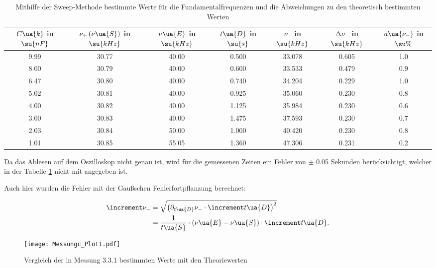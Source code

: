 \begin{table}
  \centering
  \begin{tabular}{ c | c | c | c | c | c | c }
    \toprule $C\ua{k}$ in $\su{nF}$
           & $\nu_{+} \, (\nu\ua{S})$ in $\su{kHz}$ & $\nu\ua{E}$ in $\su{kHz}$
           & $t\ua{D}$ in $\su{s}$ & $\nu_{-}$ in $\su{kHz}$
           & $\increment \nu_{-}$ in $\su{kHz}$ & $a\ua{\nu_{-}}$ in $\su{\%}$ \\
    \midrule
    9.99 & 30.77 & 40.00 & 0.500 & 33.078 & 0.605 & 1.0 \\
    8.00 & 30.79 & 40.00 & 0.600 & 33.533 & 0.479 & 0.9 \\
    6.47 & 30.80 & 40.00 & 0.740 & 34.204 & 0.229 & 1.0 \\
    5.02 & 30.81 & 40.00 & 0.925 & 35.060 & 0.230 & 0.8 \\
    4.00 & 30.82 & 40.00 & 1.125 & 35.984 & 0.230 & 0.6 \\
    3.00 & 30.83 & 40.00 & 1.475 & 37.593 & 0.230 & 0.7 \\
    2.03 & 30.84 & 50.00 & 1.000 & 40.420 & 0.230 & 0.8 \\
    1.01 & 30.85 & 55.05 & 1.360 & 47.306 & 0.231 & 0.2 \\
    \bottomrule
  \end{tabular}
  \caption{Mithilfe der Sweep-Methode bestimmte Werte für die Fundamentalfrequenzen
           und die Abweichungen zu den theoretisch bestimmten Werten}
  \label{tab:Messungc}
\end{table}

Da das Ablesen auf dem Oszilloskop nicht genau ist, wird für die gemessenen
Zeiten ein Fehler von $\pm$ 0.05 Sekunden berücksichtigt, welcher in der Tabelle
\ref{tab:Messungc} nicht mit angegeben ist.

Auch hier wurden die Fehler mit der Gaußschen Fehlerfortpflanzung berechnet:

\begin{align}
  \increment \nu_{-} &= \sqrt{\left(\partial_{t\ua{D}} \nu_{-} \cdot \increment t\ua{D}\right)^2} \\
                     &= \frac{1}{t\ua{S}}\cdot ( \nu\ua{E} - \nu\ua{S}) \cdot \increment t\ua{D} .
\end{align}

\begin{figure}
 \texttt{[image: Messungc\_Plot1.pdf]}
 \caption{Vergleich der in Messung 3.3.1 bestimmten Werte mit den Theoriewerten}
 \label{fig:Messungc}
\end{figure}

